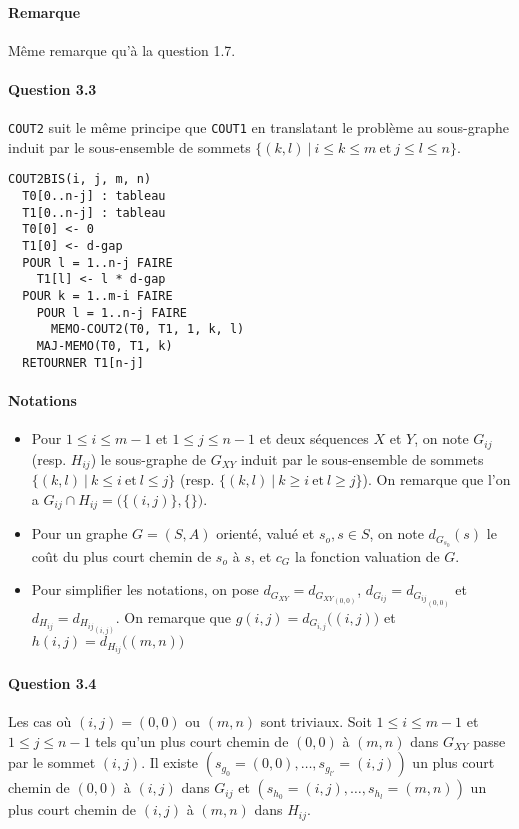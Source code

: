\paragraph{Remarque}
M\^eme remarque qu'\`a la question 1.7.

\paragraph{Question 3.3}
\verb'COUT2' suit le m\^eme principe que \verb'COUT1' en translatant
le probl\`eme au sous-graphe induit par le sous-ensemble de sommets
$\big\{(k,l)\ \big|\ i\leq k\leq m\ \text{et}\ j\leq l\leq n\big\}$.
\begin{verbatim}
COUT2BIS(i, j, m, n)
  T0[0..n-j] : tableau
  T1[0..n-j] : tableau
  T0[0] <- 0
  T1[0] <- d-gap
  POUR l = 1..n-j FAIRE
    T1[l] <- l * d-gap
  POUR k = 1..m-i FAIRE
    POUR l = 1..n-j FAIRE
      MEMO-COUT2(T0, T1, 1, k, l)
    MAJ-MEMO(T0, T1, k)
  RETOURNER T1[n-j]
\end{verbatim}
\paragraph{Notations}
\begin{itemize}
\item Pour $1\leq i\leq m-1$ et $1\leq j\leq n-1$ et deux s\'equences
  $X$ et $Y$, on note $G_{ij}$ (resp. $H_{ij}$) le sous-graphe de
  $G_{XY}$ induit par le sous-ensemble de sommets
  $\big\{(k,l)\ |\ k\leq i\ \text{et}\ l\leq j\big\}$
  (resp. $\big\{(k,l)\ |\ k\geq i\ \text{et}\ l\geq j\big\}$).
  On remarque que l'on a $G_{ij}\cap H_{ij}=\big(\{(i,j)\},\{\}\big)$.
\item Pour un graphe $G=(S,A)$ orient\'e, valu\'e et $s_o,s\in S$, on
  note $d_{G_{s_0}}(s)$ le co\^ut du plus court chemin de $s_o$ \`a
  $s$, et $c_G$ la fonction valuation de $G$.
\item Pour simplifier les notations, on pose
  $d_{G_{XY}}=d_{{G_{XY}}_{(0,0)}}$, $d_{G_{ij}}=d_{{G_{ij}}_{(0,0)}}$
  et $d_{H_{ij}}=d_{{H_{ij}}_{(i,j)}}$. On remarque que
  $g(i,j)=d_{G_{i,j}}\big((i,j)\big)$ et
  $h(i,j)=d_{H_{ij}}\big((m,n)\big)$
\end{itemize}

\paragraph{Question 3.4}
Les cas o\`u $(i,j)=(0,0)$ ou $(m,n)$ sont triviaux. Soit
$1\leq i\leq m-1$ et $1\leq j\leq n-1$ tels qu'un plus court
chemin de $(0,0)$ \`a $(m,n)$ dans $G_{XY}$ passe par le sommet
$(i,j)$. Il existe $(s_{g_0}=(0,0),\ldots,s_{g_{l'}}=(i,j))$ un plus
court chemin de $(0,0)$ \`a $(i,j)$ dans $G_{ij}$ et
$(s_{h_0}=(i,j),\ldots,s_{h_l}=(m,n))$ un plus court chemin de $(i,j)$
\`a $(m,n)$ dans $H_{ij}$.

